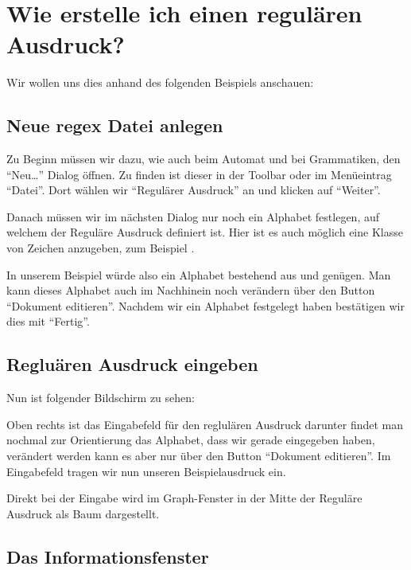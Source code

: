 \chapter{Wie erstelle ich einen regulären Ausdruck?}

Wir wollen uns dies anhand des folgenden Beispiels anschauen: 

\section{Neue regex Datei anlegen}

Zu Beginn müssen wir dazu, wie auch beim Automat und bei Grammatiken, den "`Neu\ldots"' Dialog öffnen. Zu finden ist dieser in der Toolbar oder im Menüeintrag "`Datei"'. Dort wählen wir "`Regulärer Ausdruck"' an und klicken auf "`Weiter"'.\vspace{10pt}

Danach müssen wir im nächsten Dialog nur noch ein Alphabet festlegen, auf welchem der Reguläre Ausdruck definiert ist. Hier ist es auch möglich eine Klasse von Zeichen anzugeben, zum Beispiel \Symbol{[a-z]}.\vspace{10pt}

In unserem Beispiel würde also ein Alphabet bestehend aus  und  genügen. Man kann dieses Alphabet auch im Nachhinein noch verändern über den Button "`Dokument editieren"'. Nachdem wir ein Alphabet festgelegt haben bestätigen wir dies mit "`Fertig"'.\vspace{10pt}

\section{Regluären Ausdruck eingeben}

Nun ist folgender Bildschirm zu sehen:\vspace{10pt}

Oben rechts ist das Eingabefeld für den reglulären Ausdruck darunter findet man nochmal zur Orientierung das Alphabet, dass wir gerade eingegeben haben, verändert werden kann es aber nur über den Button "`Dokument editieren"'. Im Eingabefeld tragen wir nun unseren Beispielausdruck  ein.\vspace{10pt}

Direkt bei der Eingabe wird im Graph-Fenster in der Mitte der Reguläre Ausdruck als Baum dargestellt.

\section{Das Informationsfenster}

